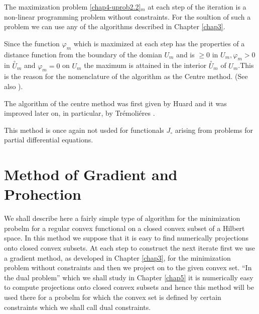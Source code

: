 \begin{remark}\label{chap4-rem2.1}
The maximization problem \ref{chap4-uprob2.2}$_{m}$ at each step of the iteration is a non-linear programming problem without constraints. For the soultion of such a problem we can use any of the algorithms described in Chapter \ref{chap3}.
\end{remark}

\begin{remark}\label{chap4-rem2.2}
Since the function $\varphi_{m}$ which is maximized at each step has the properties of a distance function from the boundary of the domian $U_{m}$ and is $\geq 0$ in $U_{m}, \varphi_{m} > 0$ in $\overset{\circ}{U}_{m}$ and $\varphi_{m} = 0$ on $U_{m}$ the maximum is attained in the interior $\overset{\circ}{U}_{m}$ of $U_{m}$.\pageoriginale This is the reason for the nomenclature of the algorithm as the Centre method. (See also \cite{key45}).
\end{remark}

\begin{remark}\label{chap4-rem2.3}
The algorithm of the centre method was first given by Huard \cite{key25} and it was improved later on, in particular, by Tr\'{e}moli\'{e}res \cite{key45}.
\end{remark}

\begin{remark}\label{chap4-rem2.4}
This method is once again not usded for functionals $J_{\circ}$ arising from problems for partial differential equations.
\end{remark}

\section{Method of Gradient and Prohection}\label{chap4-sec3}
We shall describe here a fairly simple type of algorithm for the minimization probelm for a regular convex functional on a closed convex subset of a Hilbert space. In this method we suppose that it is easy to find numerically projections onto closed convex subsets. At each step to construct the next iterate first we use a gradient method, as developed in Chapter \ref{chap3}, for the minimization problem without constraints and then we project on to the given convex set. ``In the dual problem'' which we shall study in Chapter \ref{chap5} it is numerically easy to compute projections onto closed convex subsets and hence this method will be used there for a probelm for which the convex set is defined by certain constraints which we shall call dual constraints.

